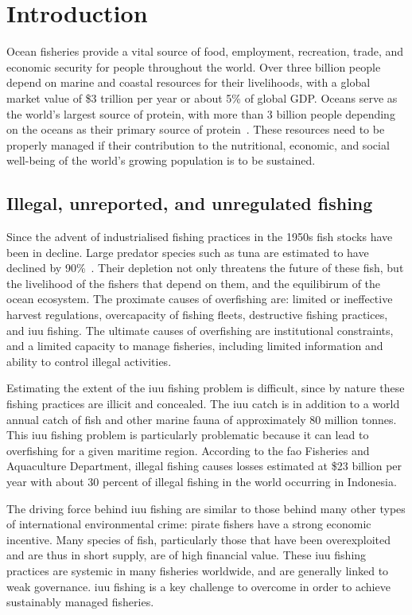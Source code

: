 \section{Introduction}
Ocean fisheries provide a vital source of food, employment, recreation, trade, and economic security for people throughout the world. Over three billion people depend on marine and coastal resources for their livelihoods, with a global market value of \$3 trillion per year or about 5\% of global GDP. Oceans serve as the world's largest source of protein, with more than 3 billion people depending on the oceans as their primary source of protein~\cite{sgd14}. These resources need to be properly managed if their contribution to the nutritional, economic, and social well-being of the world's growing population is to be sustained. 

\subsection{Illegal, unreported, and unregulated fishing}
Since the advent of industrialised fishing practices in the 1950s fish stocks have been in decline. Large predator species such as tuna are estimated to have declined by 90\%~\cite{Myers2003}. Their depletion not only threatens the future of these fish, but the livelihood of the fishers that depend on them, and the equilibirum of the ocean ecosystem. The proximate causes of overfishing are: limited or ineffective harvest regulations, overcapacity of fishing fleets, destructive fishing practices, and \gls{iuu} fishing. The ultimate causes of overfishing are institutional constraints, and a limited capacity to manage fisheries, including limited information and ability to control illegal activities.

Estimating the extent of the \gls{iuu} fishing problem is difficult, since by nature these fishing practices are illicit and concealed. The \gls{iuu} catch is in addition to a world annual catch of fish and other marine fauna of approximately 80 million tonnes. This \gls{iuu} fishing problem is particularly problematic because it can lead to overfishing for a given maritime region. According to the \gls{fao} Fisheries and Aquaculture Department, illegal fishing causes losses estimated at \$23 billion per year with about 30 percent of illegal fishing in the world occurring in Indonesia. 

The driving force behind \gls{iuu} fishing are similar to those behind many other types of international environmental crime: pirate fishers have a strong economic incentive. Many species of fish, particularly those that have been overexploited and are thus in short supply, are of high financial value. These \gls{iuu} fishing practices are systemic in many fisheries worldwide, and are generally linked to weak governance. \gls{iuu} fishing is a key challenge to overcome in order to achieve sustainably managed fisheries.

